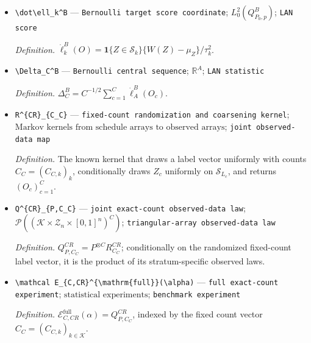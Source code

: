 \documentclass{article}
\begin{document}
\begin{itemize}
  \par\smallskip\noindent\emph{Definition.} The image of \((Q^B_{P,p})^{\otimes C}\) under coordinatewise reduction \(O_c\mapsto O_c^{\mathrm{hit}}\).
  \item \texttt{\textbackslash{}\allowbreak{}dot\textbackslash{}\allowbreak{}ell\_\allowbreak{}k\textasciicircum{}B} --- \texttt{Bernoulli target score coordinate}; \(L^2_0(Q^B_{P_0,p})\); \texttt{LAN score}
  \par\smallskip\noindent\emph{Definition.} \(\dot\ell_k^B(O)=\mathbf 1\{Z\in\mathcal S_k\}\{W(Z)-\mu_Z\}/\tau_k^2\).
  \item \texttt{\textbackslash{}\allowbreak{}Delta\_\allowbreak{}C\textasciicircum{}B} --- \texttt{Bernoulli central sequence}; \(\mathbb R^A\); \texttt{LAN statistic}
  \par\smallskip\noindent\emph{Definition.} \(\Delta_C^B=C^{-1/2}\sum_{c=1}^C\dot\ell_A^B(O_c)\).
  \item \texttt{R\textasciicircum{}\{CR\}\allowbreak{}\_\allowbreak{}\{C\_\allowbreak{}C\}\allowbreak{}} --- \texttt{fixed-\allowbreak{}count randomization and coarsening kernel}; \(\text{Markov kernels from schedule arrays to observed arrays}\); \texttt{joint observed-\allowbreak{}data map}
  \par\smallskip\noindent\emph{Definition.} The known kernel that draws a label vector uniformly with counts \(C_C=(C_{C,k})_k\), conditionally draws \(Z_c\) uniformly on \(\mathcal S_{L_c}\), and returns \((O_c)_{c=1}^C\).
  \item \texttt{Q\textasciicircum{}\{CR\}\allowbreak{}\_\allowbreak{}\{P,\allowbreak{}C\_\allowbreak{}C\}\allowbreak{}} --- \texttt{joint exact-\allowbreak{}count observed-\allowbreak{}data law}; \(\mathcal P((\mathcal K\times\mathcal Z_n\times[0,1]^n)^C)\); \texttt{triangular-\allowbreak{}array observed-\allowbreak{}data law}
  \par\smallskip\noindent\emph{Definition.} \(Q^{CR}_{P,C_C}=P^{\otimes C}R^{CR}_{C_C}\); conditionally on the randomized fixed-count label vector, it is the product of its stratum-specific observed laws.
  \item \texttt{\textbackslash{}\allowbreak{}mathcal E\_\allowbreak{}\{C,\allowbreak{}CR\}\allowbreak{}\textasciicircum{}\{\textbackslash{}\allowbreak{}mathrm\{full\}\allowbreak{}\}\allowbreak{}(\textbackslash{}\allowbreak{}alpha)} --- \texttt{full exact-\allowbreak{}count experiment}; \(\text{statistical experiments}\); \texttt{benchmark experiment}
  \par\smallskip\noindent\emph{Definition.} \(\mathcal E_{C,CR}^{\mathrm{full}}(\alpha)=Q^{CR}_{P,C_C}\), indexed by the fixed count vector \(C_C=(C_{C,k})_{k\in\mathcal K}\).

\end{itemize}
\end{document}
